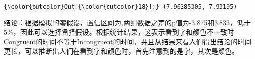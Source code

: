 \documentclass[11pt]{article}
\begin{document}
\begin{Verbatim}[commandchars=\\\{\}]
{\color{outcolor}Out[{\color{outcolor}18}]:} (7.96285305, 7.93195)
\end{Verbatim}
            
    结论：根据模拟的零假设，置信区间为,两组数据之差的p值为-3.875和3.833，低于5\%，因此可以选择备择假设。根据统计结果，这表示看到字和颜色不一致时Congruent的时间不等于Incongruent的时间，并且从结果来看人们得出结论的时间更长，可以推断出人们在看到字和颜色时，首先注意到的是字，其次是颜色。


    
    
    
    
\end{document}
